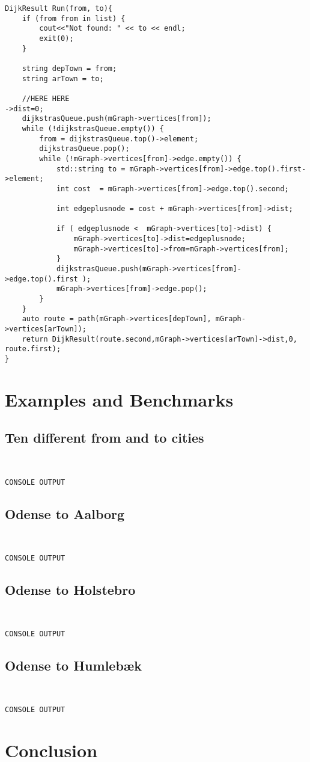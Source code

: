 \begin{lstlisting}
DijkResult Run(from, to){
	if (from from in list) {
		cout<<"Not found: " << to << endl;
		exit(0);
	}

	string depTown = from;
	string arTown = to;

	//HERE HERE 
->dist=0;
	dijkstrasQueue.push(mGraph->vertices[from]);
	while (!dijkstrasQueue.empty()) {
		from = dijkstrasQueue.top()->element;
		dijkstrasQueue.pop();
		while (!mGraph->vertices[from]->edge.empty()) {
			std::string to = mGraph->vertices[from]->edge.top().first->element;
			int cost  = mGraph->vertices[from]->edge.top().second;

			int edgeplusnode = cost + mGraph->vertices[from]->dist;

			if ( edgeplusnode <  mGraph->vertices[to]->dist) {
				mGraph->vertices[to]->dist=edgeplusnode;
				mGraph->vertices[to]->from=mGraph->vertices[from];
			}
			dijkstrasQueue.push(mGraph->vertices[from]->edge.top().first );
			mGraph->vertices[from]->edge.pop();
		}
	}
	auto route = path(mGraph->vertices[depTown], mGraph->vertices[arTown]);
	return DijkResult(route.second,mGraph->vertices[arTown]->dist,0, route.first);
}
\end{lstlisting}

\section{Examples and Benchmarks}
\subsection{Ten different from and to cities}
\begin{lstlisting}


CONSOLE OUTPUT

\end{lstlisting}


\subsection{Odense to Aalborg}
\begin{lstlisting}


CONSOLE OUTPUT

\end{lstlisting}

	
\subsection{Odense to Holstebro}

\begin{lstlisting}


CONSOLE OUTPUT

\end{lstlisting}

\subsection{Odense to Humlebæk}

\begin{lstlisting}


CONSOLE OUTPUT

\end{lstlisting}



\section{Conclusion}


